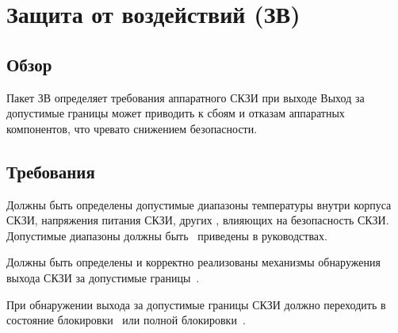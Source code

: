 \section{Защита от воздействий (ЗВ)}\label{EF}

\subsection{Обзор}\label{EF.Intro}

Пакет ЗВ определяет требования  аппаратного СКЗИ при выходе 
%
Выход за допустимые границы может приводить к сбоям и отказам аппаратных 
компонентов, что чревато снижением безопасности.



\subsection{Требования}\label{EF.Reqs}

\label{R.EF.Ranges}
Должны быть определены допустимые диапазоны температуры внутри корпуса СКЗИ, 
напряжения питания СКЗИ, других , 
влияющих на безопасность СКЗИ. Допустимые диапазоны 
должны быть~ приведены в руководствах.

\label{R.EF.Detect}
Должны быть определены и корректно реализованы механизмы 
обнаружения выхода  СКЗИ 
за допустимые границы~. 

\label{R.EF.Lock}
При обнаружении выхода за допустимые границы СКЗИ должно переходить
в состояние блокировки~ или полной 
блокировки~. 
